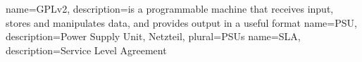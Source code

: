	{
 	 name=GPLv2,
 	 description={is a programmable machine that receives input,
               stores and manipulates data, and provides
               output in a useful format}
	}
	{
	name=PSU,
	description={Power Supply Unit, Netzteil},
	plural=PSUs
	}
	{
	name=SLA,
	description={Service Level Agreement}
	}
